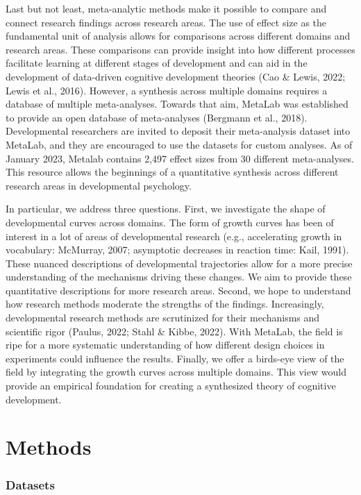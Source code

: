 \documentclass[10pt, letterpaper]{article}
\begin{document}
Last but not least, meta-analytic methods make it possible to compare
and connect research findings across research areas. The use of effect
size as the fundamental unit of analysis allows for comparisons across
different domains and research areas. These comparisons can provide
insight into how different processes facilitate learning at different
stages of development and can aid in the development of data-driven
cognitive development theories (Cao \& Lewis, 2022; Lewis et al., 2016).
However, a synthesis across multiple domains requires a database of
multiple meta-analyses. Towards that aim, MetaLab was established to
provide an open database of meta-analyses (Bergmann et al., 2018).
Developmental researchers are invited to deposit their meta-analysis
dataset into MetaLab, and they are encouraged to use the datasets for
custom analyses. As of January 2023, Metalab contains 2,497 effect sizes
from 30 different meta-analyses. This resource allows the beginnings of
a quantitative synthesis across different research areas in
developmental psychology.

In particular, we address three questions. First, we investigate the
shape of developmental curves across domains. The form of growth curves
has been of interest in a lot of areas of developmental research (e.g.,
accelerating growth in vocabulary: McMurray, 2007; asymptotic decreases
in reaction time: Kail, 1991). These nuanced descriptions of
developmental trajectories allow for a more precise understanding of the
mechanisms driving these changes. We aim to provide these quantitative
descriptions for more research areas. Second, we hope to understand how
research methods moderate the strengths of the findings. Increasingly,
developmental research methods are scrutinized for their mechanisms and
scientific rigor (Paulus, 2022; Stahl \& Kibbe, 2022). With MetaLab, the
field is ripe for a more systematic understanding of how different
design choices in experiments could influence the results. Finally, we
offer a birds-eye view of the field by integrating the growth curves
across multiple domains. This view would provide an empirical foundation
for creating a synthesized theory of cognitive development.

\hypertarget{methods}{%
\section{Methods}\label{methods}}

\hypertarget{datasets}{%
\subsubsection{Datasets}\label{datasets}}
\end{document}
